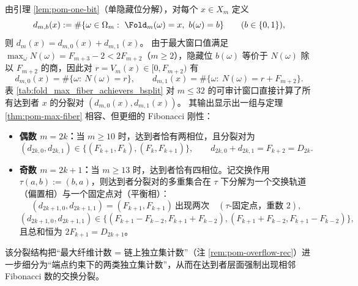 \begin{remark}\label{rem:pom-max-fiber-achievers-bsplit}
由引理 \ref{lem:pom-one-bit}（单隐藏位分解），对每个 \(x\in X_m\) 定义
\[
d_{m,b}(x):=\#\{\omega\in\Omega_m:\ \Fold_m(\omega)=x,\ b(\omega)=b\}\qquad(b\in\{0,1\}),
\]
则 \(d_m(x)=d_{m,0}(x)+d_{m,1}(x)\)。
由于最大窗口值满足 \(\max_{\omega}N(\omega)=F_{m+3}-2<2F_{m+2}\)（\(m\ge 2\)），隐藏位 \(b(\omega)\) 等价于 \(N(\omega)\) 除以 \(F_{m+2}\) 的商，因此对 \(r=V_m(x)\in[0,F_{m+2})\) 有
\[
d_{m,0}(x)=\#\{\omega:\ N(\omega)=r\},\qquad
d_{m,1}(x)=\#\{\omega:\ N(\omega)=r+F_{m+2}\}.
\]
表 \ref{tab:fold_max_fiber_achievers_bsplit} 对 \(m\le 32\) 的可审计窗口直接计算了所有达到者 \(x\) 的分裂对 \((d_{m,0}(x),d_{m,1}(x))\)。
其输出显示出一组与定理 \ref{thm:pom-max-fiber} 相容、但更细的 Fibonacci 刚性：
\begin{itemize}
  \item \textbf{偶数 \(m=2k\)：}当 \(m\ge 10\) 时，达到者恰有两相位，且分裂对为
  \[
  (d_{2k,0},d_{2k,1})\in\{(F_{k+1},F_k),(F_k,F_{k+1})\},\qquad d_{2k,0}+d_{2k,1}=F_{k+2}=D_{2k}.
  \]
  \item \textbf{奇数 \(m=2k+1\)：}当 \(m\ge 13\) 时，达到者恰有四相位。记交换作用 \(\tau(a,b):=(b,a)\)，则达到者分裂对的多重集合在 \(\tau\) 下分解为一个交换轨道（偏置相）与一个固定点对（平衡相）：
  \[
  (d_{2k+1,0},d_{2k+1,1})=(F_{k+1},F_{k+1})\ \text{出现两次}\quad(\tau\text{-固定点，重数 }2),
  \]
  \[
  (d_{2k+1,0},d_{2k+1,1})\in\{(F_{k+1}-F_{k-2},F_{k+1}+F_{k-2}),(F_{k+1}+F_{k-2},F_{k+1}-F_{k-2})\},
  \]
  且总和恒为 \(2F_{k+1}=D_{2k+1}\)。
\end{itemize}
该分裂结构把“最大纤维计数 = 链上独立集计数”（注 \ref{rem:pom-overflow-rec}）进一步细分为“端点约束下的两类独立集计数”，从而在达到者层面强制出现相邻 Fibonacci 数的交换分裂。
\end{remark}

